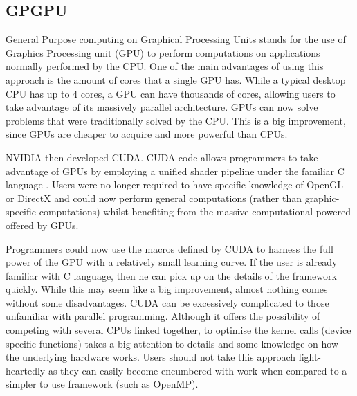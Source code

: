 \documentclass[12pt]{book}
\begin{document}
\subsection{GPGPU}

General Purpose computing on Graphical Processing Units stands for the use of Graphics Processing unit (GPU) to perform computations on applications normally performed by the CPU. One of the main advantages of using this approach is the amount of cores that a single GPU has. While a typical desktop CPU has up to 4 cores, a GPU can have thousands of cores, allowing users to take advantage of its massively parallel architecture. GPUs can now solve problems that were traditionally solved by the CPU. This is a big improvement, since GPUs are cheaper to acquire and more powerful than CPUs.\par
	NVIDIA then developed CUDA. CUDA code allows programmers to take advantage of GPUs by employing a unified shader pipeline under the familiar C language \cite{cuda_by_example}. Users were no longer required to have specific knowledge of OpenGL or DirectX and could now perform general computations (rather than graphic-specific computations) whilst benefiting from the massive computational powered offered by GPUs. 
	\par Programmers could now use the macros defined by CUDA to harness the full power of the GPU with a relatively small learning curve. If the user is already familiar with C language, then he can pick up on the details of the framework quickly. While this may seem like a big improvement, almost nothing comes without some disadvantages. CUDA can be excessively complicated to those unfamiliar with parallel programming. Although it offers the possibility of competing with several CPUs linked together, to optimise the kernel calls (device specific functions) takes a big attention to details and some knowledge on how the underlying hardware works. Users should not take this approach light-heartedly as they can easily become encumbered with work when compared to a simpler to use framework (such as OpenMP).  
\end{document}

